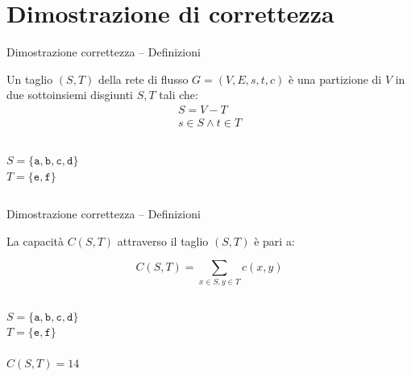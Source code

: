 \section{Dimostrazione di correttezza}

\begin{frame}{Dimostrazione correttezza -- Definizioni}

\vspace{-12pt}
\begin{myboxtitle}[Taglio]
Un \alert{taglio} $(S,T)$ della rete di flusso 
$G=(V,E,s,t,c)$ è una partizione di $V$ in due sottoinsiemi disgiunti $S,T$ tali che:
\smallskip
\begin{eqnarray*}
    S = V-T \\
    s \in S \wedge t \in T
\end{eqnarray*}
\end{myboxtitle}

\vspace{-12pt}
\begin{columns}[T]
\vspace{18pt}
$S = \{ \mathtt{a}, \mathtt{b}, \mathtt{c}, \mathtt{d} \}$\\
$T = \{ \mathtt{e}, \mathtt{f} \}$\\
\end{columns}


\end{frame}


\begin{frame}{Dimostrazione correttezza -- Definizioni}

\vspace{-12pt}
\begin{myboxtitle}
La \alert{capacità} $C(S,T)$ attraverso il taglio $(S,T)$ è pari a:

\[
  C(S,T) = \sum_{x \in S, y \in T} c(x,y)
\]
\end{myboxtitle}

\vspace{-12pt}
\begin{columns}[T]
\vspace{18pt}
$S = \{ \mathtt{a}, \mathtt{b}, \mathtt{c}, \mathtt{d} \}$\\
$T = \{ \mathtt{e}, \mathtt{f} \}$\\
~\\
$C(S,T) = 14$
\end{columns}

\end{frame}

